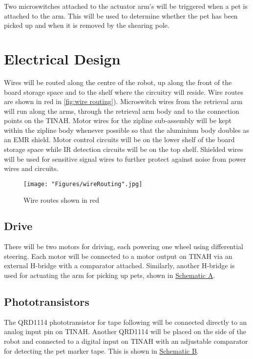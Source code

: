 \documentclass[11pt, oneside]{article} %
\begin{document}
	Two microswitches attached to the actuator arm's will be triggered when a pet is attached to the arm. This will be used to determine whether the pet has been picked up and when it is removed by the shearing pole.
	

\section{Electrical Design}

Wires will be routed along the centre of the robot, up along the front of the board storage space and to the shelf where the circuitry will reside. Wire routes are shown in red in \autoref{fig:wire routing}). Microswitch wires from the retrieval arm will run along the arms, through the retrieval arm body and to the connection points on the TINAH. Motor wires for the zipline sub-assembly will be kept within the zipline body whenever possible so that the aluminium body doubles as an EMR shield. Motor control circuits will be on the lower shelf of the board storage space while IR detection circuits will be on the top shelf. Shielded wires will be used for sensitive signal wires to further protect against noise from power wires and circuits.

\begin{figure}[h]
	\centering
	\texttt{[image: "Figures/wireRouting".jpg]}
	\caption[Wire Routing]{Wire routes shown in red}
	\label{fig:wire routing}
\end{figure}

	\newpage
	\subsection{Drive}
	
	There will be two motors for driving, each powering one wheel using differential steering. Each motor will be connected to a motor output on TINAH via an external H-bridge with a comparator attached. Similarly, another H-bridge is used for actuating the arm for picking up pets, shown in \hyperref[sch:A]{Schematic A}.
	
	\subsection{Phototransistors}
	
	The QRD1114 phototransistor for tape following will be connected directly to an analog input pin on TINAH. Another QRD1114 will be placed on the side of the robot and connected to a digital input on TINAH with an adjustable comparator for detecting the pet marker tape. This is shown in \hyperref[sch:B]{Schematic B}.
	
\end{document}
